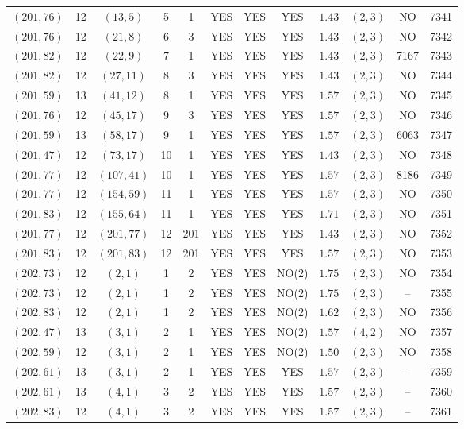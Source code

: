 \begin{longtable}{|c|c|c|c|c|c|c|c|c|c|c|c|}
$(201,76)$ & 12 & $(13,5)$ & 5 & 1 & YES & YES & YES & $1.43$ & $(2,3)$ & NO & 7341\\
$(201,76)$ & 12 & $(21,8)$ & 6 & 3 & YES & YES & YES & $1.43$ & $(2,3)$ & NO & 7342\\
$(201,82)$ & 12 & $(22,9)$ & 7 & 1 & YES & YES & YES & $1.43$ & $(2,3)$ & 7167 & 7343\\
$(201,82)$ & 12 & $(27,11)$ & 8 & 3 & YES & YES & YES & $1.43$ & $(2,3)$ & NO & 7344\\
$(201,59)$ & 13 & $(41,12)$ & 8 & 1 & YES & YES & YES & $1.57$ & $(2,3)$ & NO & 7345\\
$(201,76)$ & 12 & $(45,17)$ & 9 & 3 & YES & YES & YES & $1.57$ & $(2,3)$ & NO & 7346\\
$(201,59)$ & 13 & $(58,17)$ & 9 & 1 & YES & YES & YES & $1.57$ & $(2,3)$ & 6063 & 7347\\
$(201,47)$ & 12 & $(73,17)$ & 10 & 1 & YES & YES & YES & $1.43$ & $(2,3)$ & NO & 7348\\
$(201,77)$ & 12 & $(107,41)$ & 10 & 1 & YES & YES & YES & $1.57$ & $(2,3)$ & 8186 & 7349\\
$(201,77)$ & 12 & $(154,59)$ & 11 & 1 & YES & YES & YES & $1.57$ & $(2,3)$ & NO & 7350\\
$(201,83)$ & 12 & $(155,64)$ & 11 & 1 & YES & YES & YES & $1.71$ & $(2,3)$ & NO & 7351\\
$(201,77)$ & 12 & $(201,77)$ & 12 & 201 & YES & YES & YES & $1.43$ & $(2,3)$ & NO & 7352\\
$(201,83)$ & 12 & $(201,83)$ & 12 & 201 & YES & YES & YES & $1.57$ & $(2,3)$ & NO & 7353\\
$(202,73)$ & 12 & $(2,1)$ & 1 & 2 & YES & YES & NO(2) & $1.75$ & $(2,3)$ & NO & 7354\\
$(202,73)$ & 12 & $(2,1)$ & 1 & 2 & YES & YES & NO(2) & $1.75$ & $(2,3)$ & -- & 7355\\
$(202,83)$ & 12 & $(2,1)$ & 1 & 2 & YES & YES & NO(2) & $1.62$ & $(2,3)$ & NO & 7356\\
$(202,47)$ & 13 & $(3,1)$ & 2 & 1 & YES & YES & NO(2) & $1.57$ & $(4,2)$ & NO & 7357\\
$(202,59)$ & 12 & $(3,1)$ & 2 & 1 & YES & YES & NO(2) & $1.50$ & $(2,3)$ & NO & 7358\\
$(202,61)$ & 13 & $(3,1)$ & 2 & 1 & YES & YES & YES & $1.57$ & $(2,3)$ & -- & 7359\\
$(202,61)$ & 13 & $(4,1)$ & 3 & 2 & YES & YES & YES & $1.57$ & $(2,3)$ & -- & 7360\\
$(202,83)$ & 12 & $(4,1)$ & 3 & 2 & YES & YES & YES & $1.57$ & $(2,3)$ & -- & 7361\\

\end{longtable}
